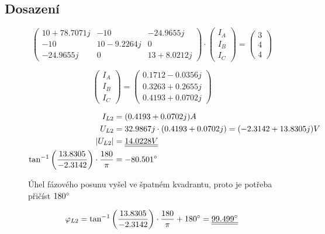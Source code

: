 \subsection{Dosazení}
\begin{figure}[H]

  $$
    \begin{pmatrix}
      10 + 78.7071j & -10         & -24.9655j    \\
      -10           & 10 -9.2264j & 0            \\
      -24.9655j     & 0           & 13 + 8.0212j
    \end{pmatrix}
    \cdot
    \begin{pmatrix}
      I_A \\
      I_B \\
      I_C
    \end{pmatrix}
    =
    \begin{pmatrix}
      3 \\
      4 \\
      4
    \end{pmatrix}
  $$

  $$
    \begin{pmatrix}
      I_A \\
      I_B \\
      I_C
    \end{pmatrix}
    =
    \begin{pmatrix}
      0.1712 - 0.0356j \\
      0.3263 + 0.2655j \\
      0.4193 + 0.0702j
    \end{pmatrix}
  $$

  \begin{equation*}
    \begin{aligned}
      I_{L2}                                                                      & = (0.4193 + 0.0702j) A                                       \\
      U_{L2}                                                                      & = 32.9867j \cdot (0.4193 + 0.0702j) = (-2.3142 + 13.8305j) V \\
      |U_{L2}|                                                                    & = \underline{\underline{14.0228 V}}                          \\
      \mathrm{tan^{-1}}\left(\frac{13.8305}{-2.3142}\right) \cdot \frac{180}{\pi} & = -80.501 \degree
    \end{aligned}
  \end{equation*}

  Úhel fázového posunu vyšel ve špatném kvadrantu, proto je potřeba přičíst $180 \degree$

  $$ \varphi_{L2} = \mathrm{tan^{-1}}\left(\frac{13.8305}{-2.3142}\right) \cdot \frac{180}{\pi} + 180 \degree = \underline{\underline{ 99.499 \degree }}$$

\end{figure}

